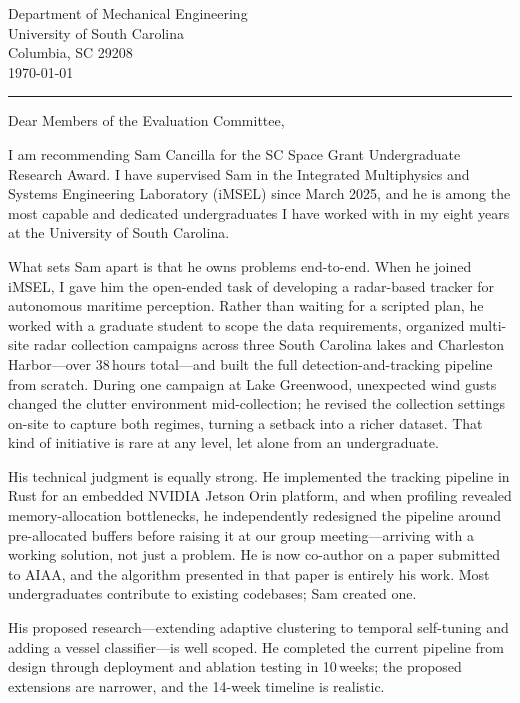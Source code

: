 \documentclass[12pt]{article}
\begin{document}
\noindent
Department of Mechanical Engineering\\
University of South Carolina\\
Columbia, SC 29208\\
\today
\vspace{0.5em}
\noindent

{\color{garnet}\rule{\textwidth}{0.5pt}}

\vspace{0.3em}

\noindent
Dear Members of the Evaluation Committee,

I am recommending Sam Cancilla for the SC Space Grant Undergraduate Research Award. I have supervised Sam in the Integrated Multiphysics and Systems Engineering Laboratory (iMSEL) since March 2025, and he is among the most capable and dedicated undergraduates I have worked with in my eight years at the University of South Carolina.

What sets Sam apart is that he owns problems end-to-end. When he joined iMSEL, I gave him the open-ended task of developing a radar-based tracker for autonomous maritime perception. Rather than waiting for a scripted plan, he worked with a graduate student to scope the data requirements, organized multi-site radar collection campaigns across three South Carolina lakes and Charleston Harbor---over 38\,hours total---and built the full detection-and-tracking pipeline from scratch. During one campaign at Lake Greenwood, unexpected wind gusts changed the clutter environment mid-collection; he revised the collection settings on-site to capture both regimes, turning a setback into a richer dataset. That kind of initiative is rare at any level, let alone from an undergraduate.

His technical judgment is equally strong. He implemented the tracking pipeline in Rust for an embedded NVIDIA Jetson Orin platform, and when profiling revealed memory-allocation bottlenecks, he independently redesigned the pipeline around pre-allocated buffers before raising it at our group meeting---arriving with a working solution, not just a problem. He is now co-author on a paper submitted to AIAA, and the algorithm presented in that paper is entirely his work. Most undergraduates contribute to existing codebases; Sam created one.

His proposed research---extending adaptive clustering to temporal self-tuning and adding a vessel classifier---is well scoped. He completed the current pipeline from design through deployment and ablation testing in 10\,weeks; the proposed extensions are narrower, and the 14-week timeline is realistic.
\end{document}
